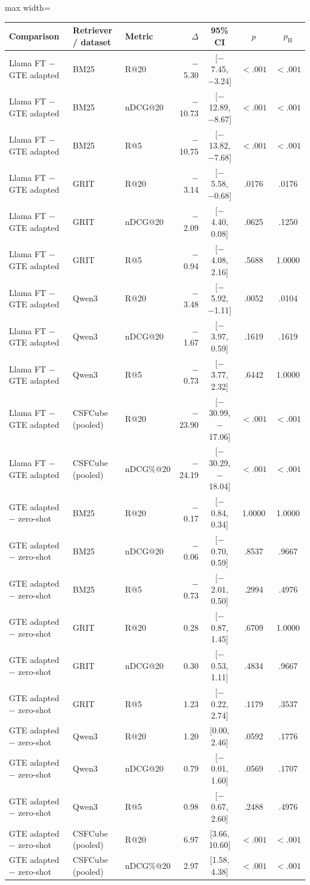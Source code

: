 \documentclass[pdflatex,sn-basic,Numbered]{sn-jnl}%
\theoremstyle{thmstyleone}%
\theoremstyle{thmstyletwo}%
\theoremstyle{thmstylethree}%
\begin{document}
\begin{table}[htbp]
\centering
\scriptsize
\setlength{\tabcolsep}{4pt}
\renewcommand{\arraystretch}{0.98}
\begin{adjustbox}{max width=\linewidth}
\begin{tabular}{l l l r c c c}
\hline
Comparison & Retriever / dataset & Metric & $\Delta$ & 95\% CI & $p$ & $p_{\mathrm{H}}$ \\
\hline
Llama FT $-$ GTE adapted & BM25 & R@20 & $-$5.30 & [$-$7.45, $-$3.24] & $<.001$ & $<.001$ \\
Llama FT $-$ GTE adapted & BM25 & nDCG@20 & $-$10.73 & [$-$12.89, $-$8.67] & $<.001$ & $<.001$ \\
Llama FT $-$ GTE adapted & BM25 & R@5 & $-$10.75 & [$-$13.82, $-$7.68] & $<.001$ & $<.001$ \\
Llama FT $-$ GTE adapted & GRIT & R@20 & $-$3.14 & [$-$5.58, $-$0.68] & .0176 & .0176 \\
Llama FT $-$ GTE adapted & GRIT & nDCG@20 & $-$2.09 & [$-$4.40, 0.08] & .0625 & .1250 \\
Llama FT $-$ GTE adapted & GRIT & R@5 & $-$0.94 & [$-$4.08, 2.16] & .5688 & 1.0000 \\
Llama FT $-$ GTE adapted & Qwen3 & R@20 & $-$3.48 & [$-$5.92, $-$1.11] & .0052 & .0104 \\
Llama FT $-$ GTE adapted & Qwen3 & nDCG@20 & $-$1.67 & [$-$3.97, 0.59] & .1619 & .1619 \\
Llama FT $-$ GTE adapted & Qwen3 & R@5 & $-$0.73 & [$-$3.77, 2.32] & .6442 & 1.0000 \\
Llama FT $-$ GTE adapted & CSFCube (pooled) & R@20 & $-$23.90 & [$-$30.99, $-$17.06] & $<.001$ & $<.001$ \\
Llama FT $-$ GTE adapted & CSFCube (pooled) & nDCG\%@20 & $-$24.19 & [$-$30.29, $-$18.04] & $<.001$ & $<.001$ \\
\hline
GTE adapted $-$ zero-shot & BM25 & R@20 & $-$0.17 & [$-$0.84, 0.34] & 1.0000 & 1.0000 \\
GTE adapted $-$ zero-shot & BM25 & nDCG@20 & $-$0.06 & [$-$0.70, 0.59] & .8537 & .9667 \\
GTE adapted $-$ zero-shot & BM25 & R@5 & $-$0.73 & [$-$2.01, 0.50] & .2994 & .4976 \\
GTE adapted $-$ zero-shot & GRIT & R@20 & 0.28 & [$-$0.87, 1.45] & .6709 & 1.0000 \\
GTE adapted $-$ zero-shot & GRIT & nDCG@20 & 0.30 & [$-$0.53, 1.11] & .4834 & .9667 \\
GTE adapted $-$ zero-shot & GRIT & R@5 & 1.23 & [$-$0.22, 2.74] & .1179 & .3537 \\
GTE adapted $-$ zero-shot & Qwen3 & R@20 & 1.20 & [0.00, 2.46] & .0592 & .1776 \\
GTE adapted $-$ zero-shot & Qwen3 & nDCG@20 & 0.79 & [$-$0.01, 1.60] & .0569 & .1707 \\
GTE adapted $-$ zero-shot & Qwen3 & R@5 & 0.98 & [$-$0.67, 2.60] & .2488 & .4976 \\
GTE adapted $-$ zero-shot & CSFCube (pooled) & R@20 & 6.97 & [3.66, 10.60] & $<.001$ & $<.001$ \\
GTE adapted $-$ zero-shot & CSFCube (pooled) & nDCG\%@20 & 2.97 & [1.58, 4.38] & $<.001$ & $<.001$ \\
\hline


\end{tabular}
\end{adjustbox}
\end{table}
\end{document}

